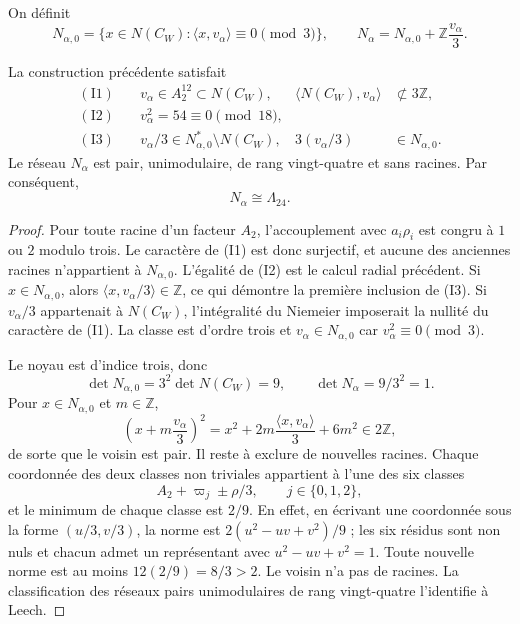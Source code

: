 On définit
\[
N_{\alpha,0}=\{x\in N(C_W):
\langle x,v_\alpha\rangle\equiv0\pmod3\},
\qquad
N_\alpha=N_{\alpha,0}+\mathbb Z\frac{v_\alpha}{3}.
\]

\begin{theorem}
La construction précédente satisfait
\begin{align*}
\mathrm{(I1)}\quad&v_\alpha\in A_2^{12}\subset N(C_W),
&\langle N(C_W),v_\alpha\rangle&\not\subset3\mathbb Z,\\
\mathrm{(I2)}\quad&v_\alpha^2=54\equiv0\pmod{18},\\
\mathrm{(I3)}\quad&v_\alpha/3\in
N_{\alpha,0}^*\setminus N(C_W),
&3(v_\alpha/3)&\in N_{\alpha,0}.
\end{align*}
Le réseau \(N_\alpha\) est pair, unimodulaire, de rang vingt-quatre et sans
racines. Par conséquent,
\[
N_\alpha\cong\Lambda_{24}.
\]
\end{theorem}

\begin{proof}
Pour toute racine d'un facteur \(A_2\), l'accouplement avec
\(a_i\rho_i\) est congru à \(1\) ou \(2\) modulo trois. Le caractère de
(I1) est donc surjectif, et aucune des anciennes racines n'appartient à
\(N_{\alpha,0}\). L'égalité de (I2) est le calcul radial précédent. Si
\(x\in N_{\alpha,0}\), alors
\(\langle x,v_\alpha/3\rangle\in\mathbb Z\), ce qui démontre la première
inclusion de (I3). Si \(v_\alpha/3\) appartenait à \(N(C_W)\),
l'intégralité du Niemeier imposerait la nullité du caractère de (I1). La
classe est d'ordre trois et \(v_\alpha\in N_{\alpha,0}\) car
\(v_\alpha^2\equiv0\pmod3\).

Le noyau est d'indice trois, donc
\[
\det N_{\alpha,0}=3^2\det N(C_W)=9,
\qquad
\det N_\alpha=9/3^2=1.
\]
Pour \(x\in N_{\alpha,0}\) et \(m\in\mathbb Z\),
\[
\left(x+m\frac{v_\alpha}{3}\right)^2
=x^2+2m\frac{\langle x,v_\alpha\rangle}{3}+6m^2
\in2\mathbb Z,
\]
de sorte que le voisin est pair. Il reste à exclure de nouvelles racines. Chaque coordonnée des
deux classes non triviales appartient à l'une des six classes
\[
A_2+\varpi_j\pm\rho/3,\qquad j\in\{0,1,2\},
\]
et le minimum de chaque classe est \(2/9\). En effet, en écrivant une coordonnée
sous la forme \((u/3,v/3)\), la norme est
\(2(u^2-uv+v^2)/9\) ; les six résidus sont non nuls et chacun admet un
représentant avec \(u^2-uv+v^2=1\). Toute
nouvelle norme est au moins \(12(2/9)=8/3>2\). Le voisin n'a pas de racines. La
classification des réseaux pairs unimodulaires de rang vingt-quatre
l'identifie à Leech.
\end{proof}


